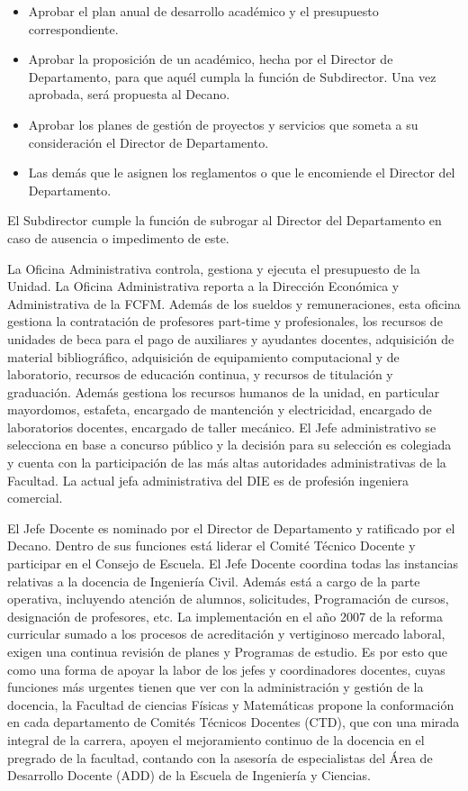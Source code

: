 \begin{itemize}
\item Aprobar el plan anual de desarrollo académico y el presupuesto correspondiente.
\item Aprobar la proposición de un académico, hecha por el Director de Departamento, para que
aquél cumpla la función de Subdirector. Una vez aprobada, será propuesta al Decano.
\item Aprobar los planes de gestión de proyectos y servicios que someta a su consideración el
Director de Departamento.
\item Las demás que le asignen los reglamentos o que le encomiende el Director del Departamento.
\end{itemize}

El Subdirector cumple la función de subrogar al Director del Departamento en caso de
ausencia o impedimento de este.

La Oficina Administrativa controla, gestiona y ejecuta el presupuesto de la Unidad. La
Oficina Administrativa reporta a la Dirección Económica y Administrativa de la FCFM. Además
de los sueldos y remuneraciones, esta oficina gestiona la contratación de profesores part-time y
profesionales, los recursos de unidades de beca para el pago de auxiliares y ayudantes docentes,
adquisición de material bibliográfico, adquisición de equipamiento computacional y de laboratorio,
recursos de educación continua, y recursos de titulación y graduación. Además gestiona los
recursos humanos de la unidad, en particular mayordomos, estafeta, encargado de mantención
y electricidad, encargado de laboratorios docentes, encargado de taller mecánico. El Jefe
administrativo se selecciona en base a concurso público y la decisión para su selección es colegiada
y cuenta con la participación de las más altas autoridades administrativas de la Facultad. La actual
jefa administrativa del DIE es de profesión ingeniera comercial.

El Jefe Docente es nominado por el Director de Departamento y ratificado por el Decano.
Dentro de sus funciones está liderar el Comité Técnico Docente y participar en el Consejo de
Escuela. El Jefe Docente coordina todas las instancias relativas a la docencia de Ingeniería
Civil. Además está a cargo de la parte operativa, incluyendo atención de alumnos, solicitudes,
Programación de cursos, designación de profesores, etc. La implementación en el año 2007 de la
reforma curricular sumado a los procesos de acreditación y vertiginoso mercado laboral, exigen
una continua revisión de planes y Programas de estudio. Es por esto que como una forma de apoyar
la labor de los jefes y coordinadores docentes, cuyas funciones más urgentes tienen que ver con
la administración y gestión de la docencia, la Facultad de ciencias Físicas y Matemáticas propone
la conformación en cada departamento de Comités Técnicos Docentes (CTD), que con una mirada
integral de la carrera, apoyen el mejoramiento continuo de la docencia en el pregrado de la facultad,
contando con la asesoría de especialistas del Área de Desarrollo Docente (ADD) de la Escuela de
Ingeniería y Ciencias.

